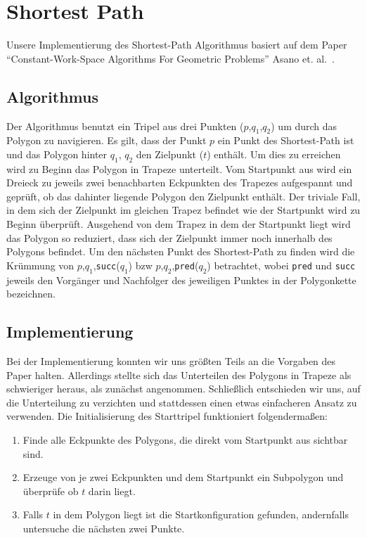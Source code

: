 \section{Shortest Path}

  Unsere Implementierung des Shortest-Path Algorithmus basiert auf dem Paper
  \enquote{Constant-Work-Space Algorithms For Geometric Problems} Asano et.
  al.~\cite{asano11shortestpath}.

  \subsection{Algorithmus}

    Der Algorithmus benutzt ein Tripel aus drei Punkten ($p$,$q_1$,$q_2$) um
    durch das Polygon zu navigieren. Es gilt, dass der Punkt $p$ ein Punkt des
    Shortest-Path ist und das Polygon hinter $q_1$, $q_2$ den Zielpunkt ($t$)
    enthält. Um dies zu erreichen wird zu Beginn das Polygon in Trapeze
    unterteilt. Vom Startpunkt aus wird ein Dreieck zu jeweils zwei
    benachbarten Eckpunkten des Trapezes aufgespannt und geprüft, ob das
    dahinter liegende Polygon den Zielpunkt enthält. Der triviale Fall, in dem
    sich der Zielpunkt im gleichen Trapez befindet wie der Startpunkt wird zu
    Beginn überprüft. Ausgehend von dem Trapez in dem der Startpunkt liegt
    wird das Polygon so reduziert, dass sich der Zielpunkt immer noch
    innerhalb des Polygons befindet. Um den nächsten Punkt des Shortest-Path
    zu finden wird die Krümmung von $p$,$q_1$,\texttt{succ}($q_1$) bzw
    $p$,$q_2$,\texttt{pred}($q_2$) betrachtet, wobei \texttt{pred} und
    \texttt{succ} jeweils den Vorgänger und Nachfolger des jeweiligen Punktes
    in der Polygonkette bezeichnen.

  \subsection{Implementierung}

    Bei der Implementierung konnten wir uns größten Teils an die Vorgaben des
    Paper halten. Allerdings stellte sich das Unterteilen des Polygons in
    Trapeze als schwieriger heraus, als zunächst angenommen. Schließlich
    entschieden wir uns, auf die Unterteilung zu verzichten und stattdessen
    einen etwas einfacheren Ansatz zu verwenden. Die Initialisierung des
    Starttripel funktioniert folgendermaßen:

    \begin{enumerate}
      \item Finde alle Eckpunkte des Polygons, die direkt vom Startpunkt aus
            sichtbar sind.
      \item Erzeuge von je zwei Eckpunkten und dem Startpunkt ein Subpolygon
            und überprüfe ob $t$ darin liegt.
      \item Falls $t$ in dem Polygon liegt ist die Startkonfiguration gefunden,
            andernfalls untersuche die nächsten zwei Punkte.
    \end{enumerate}

